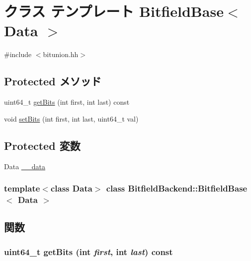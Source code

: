 \hypertarget{classBitfieldBackend_1_1BitfieldBase}{
\section{クラス テンプレート BitfieldBase$<$ Data $>$}
\label{classBitfieldBackend_1_1BitfieldBase}
}


{\ttfamily \#include $<$bitunion.hh$>$}\subsection*{Protected メソッド}
\begin{DoxyCompactItemize}
\item 
uint64\_\-t \hyperlink{classBitfieldBackend_1_1BitfieldBase_a23cc91d7b844222c1a0d428a7234ca19}{getBits} (int first, int last) const 
\item 
void \hyperlink{classBitfieldBackend_1_1BitfieldBase_af6ec12098cdf09417b70364fa80c8d33}{setBits} (int first, int last, uint64\_\-t val)
\end{DoxyCompactItemize}
\subsection*{Protected 変数}
\begin{DoxyCompactItemize}
\item 
Data \hyperlink{classBitfieldBackend_1_1BitfieldBase_a839a29b43c94e265be8e77e13e74c923}{\_\-\_\-data}
\end{DoxyCompactItemize}
\subsubsection*{template$<$class Data$>$ class BitfieldBackend::BitfieldBase$<$ Data $>$}



\subsection{関数}
\hypertarget{classBitfieldBackend_1_1BitfieldBase_a23cc91d7b844222c1a0d428a7234ca19}{
\subsubsection[{getBits}]{\setlength{\rightskip}{0pt plus 5cm}uint64\_\-t getBits (int {\em first}, \/  int {\em last}) const}}
\label{classBitfieldBackend_1_1BitfieldBase_a23cc91d7b844222c1a0d428a7234ca19}



